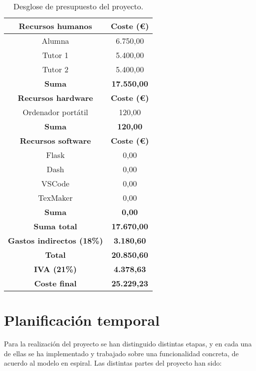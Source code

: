 \begin{table}[!h]
\caption{Desglose de presupuesto del proyecto.}
\begin{center}
\begin{tabular}{|c c|} 
 \hline
 \textbf{Recursos humanos} & \textbf{Coste (€)} \\ 
 \hline\hline
 Alumna & 6.750,00 \\
 \hline
 Tutor 1 & 5.400,00 \\
 \hline 
 Tutor 2 & 5.400,00 \\
 \textbf{Suma} & \textbf{17.550,00} \\
 \hline
 \textbf{Recursos hardware} & \textbf{Coste (€)} \\ 
 \hline\hline
 Ordenador portátil & 120,00 \\
 \hline
 \textbf{Suma} & \textbf{120,00} \\
 \hline 
 \textbf{Recursos software} & \textbf{Coste (€)} \\
 \hline
  Flask & 0,00 \\
  \hline
  Dash & 0,00 \\
  \hline 
  VSCode & 0,00 \\
  \hline
  TexMaker & 0,00 \\
  \hline 
  \textbf{Suma} & \textbf{0,00} \\ 
 \hline\hline
 \textbf{Suma total} & \textbf{17.670,00} \\
 \hline\hline
 \textbf{Gastos indirectos (18\%)} & \textbf{3.180,60} \\ 
 \hline\hline
 \textbf{Total} & \textbf{20.850,60} \\ 
 \hline\hline
 \textbf{IVA (21\%)} & \textbf{4.378,63} \\ %
 \hline\hline
 \textbf{Coste final} & \textbf{25.229,23} \\  %
 \hline\hline

 \hline
\end{tabular}
\label{tabla_pres}
\end{center}
\end{table}

\section{Planificación temporal}

Para la realización del proyecto se han distinguido distintas etapas, y en cada una de ellas se ha implementado y trabajado sobre una funcionalidad concreta, de acuerdo al modelo en espiral. Las distintas partes del proyecto han sido:

